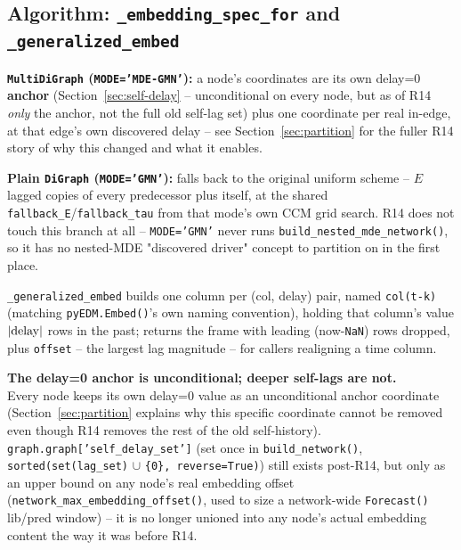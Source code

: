 \documentclass[11pt]{article}
\newenvironment{notebox}[1]{%
  \begin{framed}%
  \noindent\textbf{#1}\\[2pt]%
}{%
  \end{framed}%
}
\begin{document}
\subsection{Algorithm: \texttt{\_embedding\_spec\_for} and \texttt{\_generalized\_embed}}
\begin{steps}
\item \textbf{\texttt{MultiDiGraph} (\texttt{MODE='MDE-GMN'}):} a node's coordinates are its own delay=0 \textbf{anchor} (Section~\ref{sec:self-delay} -- unconditional on every node, but as of R14 \emph{only} the anchor, not the full old self-lag set) plus one coordinate per real in-edge, at that edge's own discovered delay -- see Section~\ref{sec:partition} for the fuller R14 story of why this changed and what it enables.
\item \textbf{Plain \texttt{DiGraph} (\texttt{MODE='GMN'}):} falls back to the original uniform scheme -- $E$ lagged copies of every predecessor plus itself, at the shared \texttt{fallback\_E}/\texttt{fallback\_tau} from that mode's own CCM grid search. R14 does not touch this branch at all -- \texttt{MODE='GMN'} never runs \texttt{build\_nested\_mde\_network()}, so it has no nested-MDE "discovered driver" concept to partition on in the first place.
\item \texttt{\_generalized\_embed} builds one column per (col, delay) pair, named \texttt{col(t-k)} (matching \texttt{pyEDM.Embed()}'s own naming convention), holding that column's value $|{\rm delay}|$ rows in the past; returns the frame with leading (now-\texttt{NaN}) rows dropped, plus \texttt{offset} -- the largest lag magnitude -- for callers realigning a time column.
\end{steps}

\begin{notebox}{The delay=0 anchor is unconditional; deeper self-lags are not.\label{sec:self-delay}}
Every node keeps its own delay=0 value as an unconditional anchor coordinate (Section~\ref{sec:partition} explains why this specific coordinate cannot be removed even though R14 removes the rest of the old self-history). \texttt{graph.graph['self\_delay\_set']} (set once in \texttt{build\_network()}, \texttt{sorted(set(lag\_set)} $\cup$ \texttt{\{0\}, reverse=True)}) still exists post-R14, but only as an upper bound on any node's real embedding offset (\texttt{network\_max\_embedding\_offset()}, used to size a network-wide \texttt{Forecast()} lib/pred window) -- it is no longer unioned into any node's actual embedding content the way it was before R14.
\end{notebox}
\end{document}
